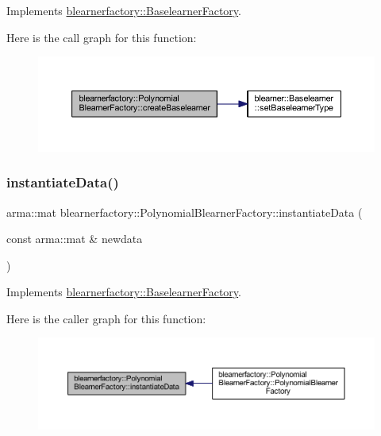 Implements \mbox{\hyperlink{classblearnerfactory_1_1_baselearner_factory_ac3584a20a84834099a15908690b837bb}{blearnerfactory\+::\+Baselearner\+Factory}}.

Here is the call graph for this function\+:\nopagebreak
\begin{figure}[H]
\begin{center}
\leavevmode
\includegraphics[width=350pt]{classblearnerfactory_1_1_polynomial_blearner_factory_ac0c7f742da0a2de444e91a0cfb0a9384_cgraph}
\end{center}
\end{figure}
\mbox{\label{classblearnerfactory_1_1_polynomial_blearner_factory_aeea9c480671ae7cf7d3be470ce0feaef}} 
\subsubsection{\texorpdfstring{instantiate\+Data()}{instantiateData()}}
{\footnotesize\ttfamily arma\+::mat blearnerfactory\+::\+Polynomial\+Blearner\+Factory\+::instantiate\+Data (\begin{DoxyParamCaption}\item[{const arma\+::mat \&}]{newdata }\end{DoxyParamCaption})\hspace{0.3cm}{\ttfamily [virtual]}}



Implements \mbox{\hyperlink{classblearnerfactory_1_1_baselearner_factory_ac4a38c4815fb33b8d4785745117c5e57}{blearnerfactory\+::\+Baselearner\+Factory}}.

Here is the caller graph for this function\+:\nopagebreak
\begin{figure}[H]
\begin{center}
\leavevmode
\includegraphics[width=350pt]{classblearnerfactory_1_1_polynomial_blearner_factory_aeea9c480671ae7cf7d3be470ce0feaef_icgraph}
\end{center}
\end{figure}


